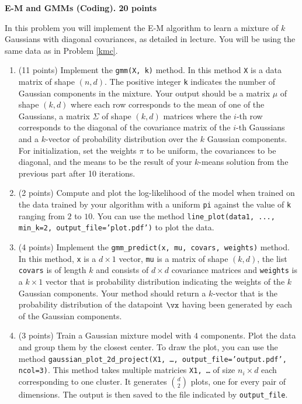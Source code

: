\documentclass{article}
\begin{document}
\begin{enumerate}
\begin{Q}
\begin{enumerate}
    \end{enumerate}
\end{Q}


\begin{Q}
  \textbf{E-M and GMMs (Coding). 20 points}

  In this problem you will implement the E-M algorithm to learn a mixture of $k$ Gaussians with diagonal covariances, as detailed in lecture. You will be using the same data as in Problem \ref{kmc}.

  \begin{enumerate}
    \item (11 points)
      Implement the \texttt{gmm(X, k)} method. In this method \texttt{X} is a data matrix of shape $(n,d)$. The positive integer \texttt{k} indicates the number of Gaussian components in the mixture. Your output should be a matrix $\mu$ of shape $(k,d)$ where each row corresponds to the mean of one of the Gaussians, a matrix $\Sigma$ of shape $(k,d)$ matrices where the $i$-th row corresponds to the diagonal of the covariance matrix of the $i$-th Gaussians and a $k$-vector of probability distribution over the $k$ Gaussian components.  For initialization, set the weights $\pi$ to be uniform, the covariances to be diagonal, and the means to be the result of your $k$-means solution from the previous part after 10 iterations.

    \item (2 points)
      Compute and plot the log-likelihood of the model when trained on the data trained by your algorithm with a uniform \texttt{pi} against the value of \texttt{k} ranging from $2$ to $10$. You can use the method \texttt{line\_plot(data1, ..., min\_k=2, output\_file='plot.pdf')} to plot the data.
\label{gmm-b}

\item (4 points)
      Implement the \texttt{gmm\_predict(x, mu, covars, weights)}
      method. In this method, \texttt{x} is a $d \times 1$ vector,
      \texttt{mu} is a matrix of shape $(k,d)$, the list
      \texttt{covars} is of length $k$ and consists of $d \times d$
      covariance matrices and \texttt{weights} is a $k \times 1$
      vector that is probability distribution indicating the weights
      of the $k$ Gaussian components. Your method should return a
      $k$-vector that is the probability distribution of the datapoint
      $\vx$ having been generated by each of the Gaussian components. \label{gmm-e}

      
    \item (3 points)
      Train a Gaussian mixture model with $4$ components. Plot the data and group them by 
      the closest center. To draw the plot, you can use the method \texttt{gaussian\_plot\_2d\_project(X1, \ldots, output\_file='output.pdf', ncol=3)}. 
      This method takes multiple matricies \texttt{X1, \ldots} of size $n_i \times d$ each corresponding to one cluster. 
      It generates ${d \choose 2}$ plots, one for every pair of dimensions. The output is then 
      saved to the file indicated by \texttt{output\_file}.


\end{enumerate}
\end{Q}
\end{enumerate}
\end{document}
